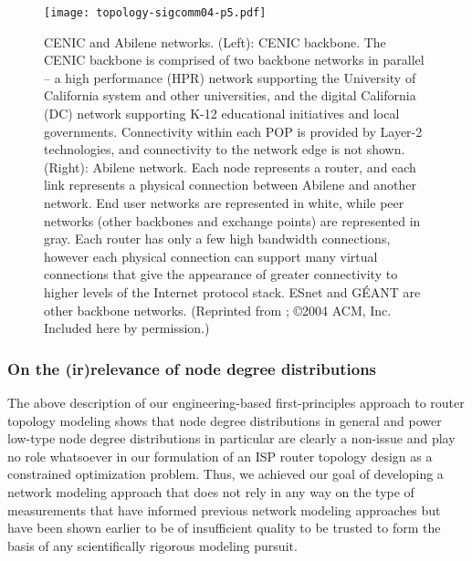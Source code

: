 \begin{figure}[p] 
  \begin{center}
    
    \texttt{[image: topology-sigcomm04-p5.pdf]}
   
    \caption{CENIC and Abilene networks. (Left): CENIC backbone. The
      CENIC backbone is comprised of two backbone networks in
      parallel -- a high performance (HPR) network supporting the
      University of California system and other universities, and the
      digital California (DC) network supporting K-12 educational
      initiatives and local governments. Connectivity within each POP
      is provided by Layer-2 technologies, and connectivity to the
      network edge is not shown. (Right): Abilene network. Each node
      represents a router, and each link represents a physical
      connection between Abilene and another network. End user
      networks are represented in white, while peer networks (other
      backbones and exchange points) are represented in gray. Each
      router has only a few high bandwidth connections, however each
      physical connection can support many virtual connections that
      give the appearance of greater connectivity to higher levels of
      the Internet protocol stack. ESnet and G\'{E}ANT are other backbone
      networks. (Reprinted from \cite{Li04}; \copyright 2004 ACM, Inc. Included here by permission.)
     \label{fig:cenic_abilene}}
  \end{center}
\end{figure}         

\subsubsection{On the (ir)relevance of node degree distributions}

The above description of our engineering-based first-principles
approach to router topology modeling shows that node degree
distributions in general and power low-type node degree distributions
in particular are clearly a non-issue and play no role whatsoever in
our formulation of an ISP router topology design as a constrained
optimization problem. Thus, we achieved our goal of developing a
network modeling approach that does not rely in any way on the type of
measurements that have informed previous network modeling approaches
but have been shown earlier to be of insufficient quality to be
trusted to form the basis of any scientifically rigorous modeling
pursuit.

